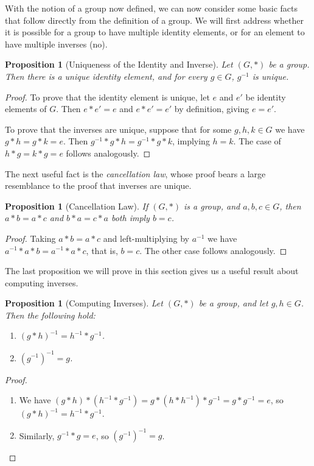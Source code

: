\documentclass[11pt, a4paper]{article}
\newtheorem{proposition}[theorem]{Proposition}
\theoremstyle{definition}
\begin{document}
With the notion of a group now defined, we can now consider some basic facts that follow directly from the definition of a group. We will first address whether it is possible for a group to have multiple identity elements, or for an element to have multiple inverses (no).

\begin{proposition}[Uniqueness of the Identity and Inverse]
	Let $(G, *)$ be a group. Then there is a unique identity element, and for every $g \in G$, $g^{-1}$ is unique.
\end{proposition}
\begin{proof}
	To prove that the identity element is unique, let $e$ and $e'$ be identity elements of $G$. Then $e* e' = e$ and $e* e' = e'$ by definition, giving $e = e'$. 
	
	To prove that the inverses are unique, suppose that for some $g, h, k \in G$ we have $g* h = g *k = e$. Then $g^{-1}* g *h = g^{-1} *g * k$, implying $h = k$. The case of $h * g = k * g = e$ follows analogously.
\end{proof}

The next useful fact is the \emph{cancellation law}, whose proof bears a large resemblance to the proof that inverses are unique.

\begin{proposition}[Cancellation Law]
	If $(G, *)$ is a group, and $a, b, c \in G$, then $a*b = a*c$ and $b*a = c*a$ both imply $b = c$.
\end{proposition}
\begin{proof}
	Taking $a * b = a * c$ and left-multiplying by $a^{-1}$ we have $a^{-1} * a * b = a^{-1} * a * c$, that is, $b = c$. The other case follows analogously.
\end{proof}

The last proposition we will prove in this section gives us a useful result about computing inverses.

\begin{proposition}[Computing Inverses]
	Let $(G, *)$ be a group, and let $g, h \in G$. Then the following hold:
	\begin{enumerate}[label=(\roman*)]
		\item $(g*h)^{-1} = h^{-1} * g^{-1}$.
		\item $(g^{-1})^{-1} = g$.
	\end{enumerate}
\end{proposition}
\begin{proof}$ $\phantom{\qedhere}
	\begin{enumerate}[label=(\roman*)]
		\item We have $(g*h) * (h^{-1} * g^{-1}) =  g * (h * h^{-1}) * g^{-1} = g * g^{-1} = e$, so $(g*h)^{-1} = h^{-1} * g^{-1}$.
		\item Similarly, $g^{-1} * g = e$, so $(g^{-1})^{-1} = g$. \hfill \qedsymbol
	\end{enumerate}
\end{proof}
\end{document}
